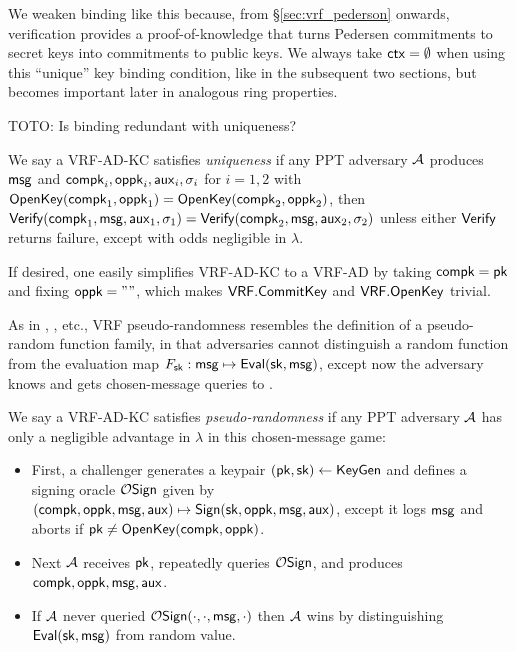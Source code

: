 We weaken binding like this because, from \S\ref{sec:vrf_pederson}
onwards, verification provides a proof-of-knowledge that turns
Pedersen commitments to secret keys into commitments to public keys.
We always take $\mathsf{ctx} = \emptyset$ when using this ``unique'' key binding
condition, like in the subsequent two sections, but
 \ctx becomes important later in analogous ring properties.

TOTO: Is binding redundant with uniqueness?

\begin{definition}
We say a VRF-AD-KC satisfies {\em uniqueness} if any PPT adversary $\mathcal{A}$
produces $\mathsf{msg}$ and $\mathsf{compk}_i,\mathsf{oppk}_i,\mathsf{aux}_i,\sigma_i$ for $i=1,2$
 with ${\mathsf{OpenKey}}(\mathsf{compk}_1,\mathsf{oppk}_1) = {\mathsf{OpenKey}}(\mathsf{compk}_2,\mathsf{oppk}_2)$, then
${\mathsf{Verify}}(\mathsf{compk}_1,\mathsf{msg},\mathsf{aux}_1,\sigma_1) = {\mathsf{Verify}}(\mathsf{compk}_2,\mathsf{msg},\mathsf{aux}_2,\sigma_2)$
unless either ${\mathsf{Verify}}$ returns failure,
except with odds negligible in $\lambda$.
\end{definition}

If desired, one easily simplifies VRF-AD-KC to a VRF-AD by
 taking $\mathsf{compk} = \mathsf{pk}$ and fixing $\mathsf{oppk} = \mathtt{""}$,
 which makes ${\mathsf{VRF}}.{\mathsf{CommitKey}}$ and ${\mathsf{VRF}}.{\mathsf{OpenKey}}$ trivial.

As in \cite{vrf_micali}, \cite{agg_dkg}, etc., VRF pseudo-randomness
resembles the definition of a pseudo-random function family, in that
adversaries cannot distinguish a random function from the evaluation
map $F_\mathsf{sk} : \mathsf{msg} \mapsto {\ensuremath{\mathsf{Eval}}}(\mathsf{sk},\mathsf{msg})$,
except now the adversary knows \pk and gets chosen-message queries to \Sign.

\begin{definition}
We say a VRF-AD-KC satisfies {\em pseudo-randomness} if 
any PPT adversary $\mathcal{A}$ has only a negligible advantage in $\lambda$
in this chosen-message game:
\begin{itemize}
 \item First, a challenger
  generates a keypair $(\mathsf{pk},\mathsf{sk}) \leftarrow {\ensuremath{\mathsf{KeyGen}}}$ and
  defines a signing oracle $\mathcal{O}\mathsf{Sign}$ given by
  $(\mathsf{compk},\mathsf{oppk},\mathsf{msg},\mathsf{aux}) \mapsto {\ensuremath{\mathsf{Sign}}}(\mathsf{sk},\mathsf{oppk},\mathsf{msg},\mathsf{aux})$,
   except it logs $\mathsf{msg}$ and aborts if $\mathsf{pk} \ne {\ensuremath{\mathsf{OpenKey}}}(\mathsf{compk},\mathsf{oppk})$.
 \item Next $\mathcal{A}$ receives $\mathsf{pk}$, repeatedly queries $\mathcal{O}\mathsf{Sign}$,
  and produces $\mathsf{compk},\mathsf{oppk},\mathsf{msg},\mathsf{aux}$. 
 \item If $\mathcal{A}$ never queried $\mathcal{O}\mathsf{Sign}(\cdot,\cdot,\mathsf{msg},\cdot)$ then
  $\mathcal{A}$ wins by distinguishing ${\mathsf{Eval}}(\mathsf{sk},\mathsf{msg})$ from random value.
\end{itemize}
\end{definition}

